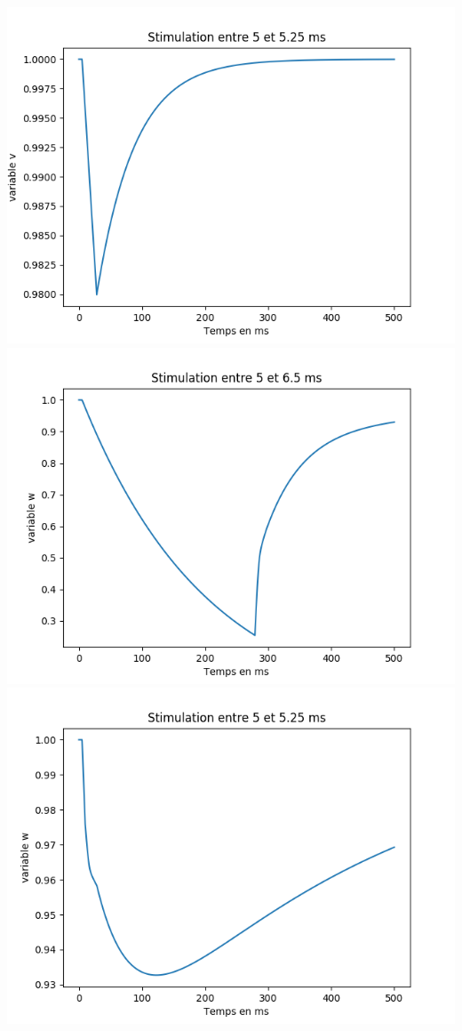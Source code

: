 \documentclass[a4paper,12pt,twoside]{report}
\begin{document}
\includegraphics[scale=0.5]{./v(t)_2.png}\\
\includegraphics[scale=0.5]{./w(t).png}\\
\includegraphics[scale=0.5]{./w(t)_2.png}\\
\end{document}
